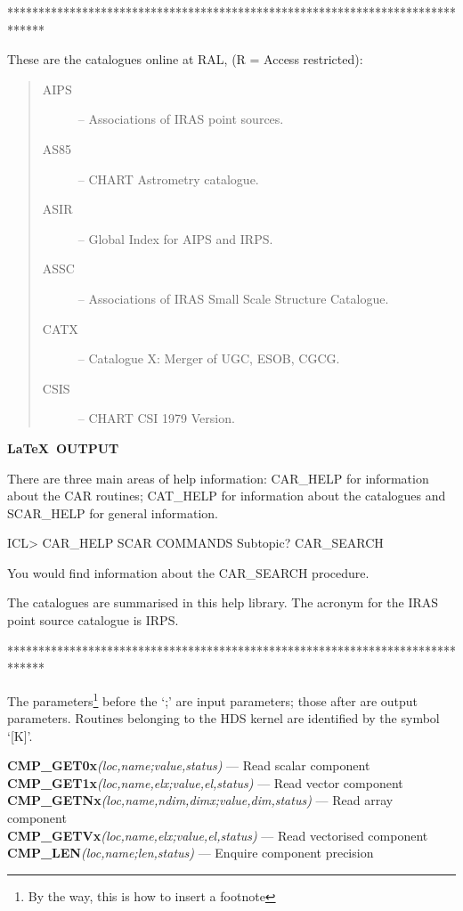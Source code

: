 \documentclass[twoside,11pt]{starlink}
\begin{document}
\begin{small}
\begin{terminalv}
******************************************************************************

These are the catalogues online at RAL, (R = Access restricted):
\begin{quote}
  \begin{description}
    \item [AIPS] -- Associations of IRAS point sources.
    \item [AS85] -- CHART Astrometry catalogue.
    \item [ASIR] -- Global Index for AIPS and IRPS.
    \item [ASSC] -- Associations of IRAS Small Scale Structure Catalogue.
    \item [CATX] -- Catalogue X: Merger of UGC, ESOB, CGCG.
    \item [CSIS] -- CHART CSI 1979 Version.
  \end{description}
\end{quote}
\end{terminalv}
\end{small}

\newpage

\begin{center}
  \textbf{\LaTeX\ OUTPUT}
\end{center}

There are three main areas of help information: CAR\_HELP for information
about the CAR routines; CAT\_HELP for information about the catalogues and
SCAR\_HELP for general information.
\begin{terminalv}
ICL> CAR_HELP
SCAR COMMANDS Subtopic? CAR_SEARCH
\end{terminalv}
You would find information about the CAR\_SEARCH procedure.
The catalogues are summarised in this help library.
The acronym for the IRAS point source catalogue is IRPS.


******************************************************************************

The parameters\footnote{By the way, this is how to insert a footnote} before
the `;' are input parameters; those after are output parameters.
Routines belonging to the HDS kernel are identified by the symbol `[K]'.

\noindent
\textbf{CMP\_GET0x}\emph{(loc,name;value,status)} --- Read scalar component\\
\textbf{CMP\_GET1x}\emph{(loc,name,elx;value,el,status)} --- Read vector component\\
\textbf{CMP\_GETNx}\emph{(loc,name,ndim,dimx;value,dim,status)} --- Read array
component\\
\textbf{CMP\_GETVx}\emph{(loc,name,elx;value,el,status)} --- Read vectorised
component\\
\textbf{CMP\_LEN}\emph{(loc,name;len,status)} --- Enquire component precision\\
\end{document}
